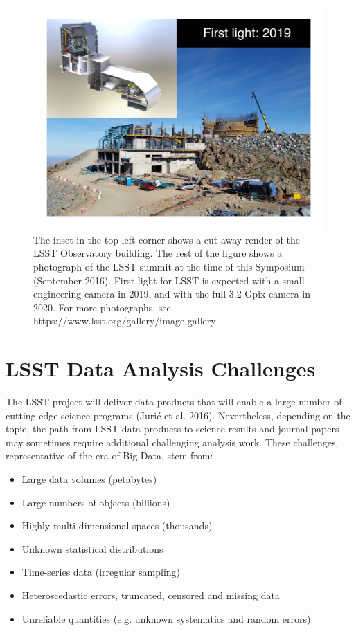 \documentclass{iau}
\begin{document}
\begin{figure}[t!]
\begin{center}
\includegraphics[width=0.99\textwidth, angle=0]{summit2019.pdf} 
\caption{
The inset in the top left corner shows a cut-away render of the LSST Observatory building. 
The rest of the figure shows a photograph of the LSST summit at the time of this 
Symposium (September 2016). First light for LSST is expected with a small engineering
camera in 2019, and with the full 3.2 Gpix camera in 2020. For more 
photographs, see https://www.lsst.org/gallery/image-gallery}
\label{fig:summit2019}
\end{center}
\end{figure}



\section{LSST Data Analysis Challenges}


The LSST project will deliver data products that will enable a large number of cutting-edge science 
programs (Juri\'{c} et al. 2016). Nevertheless, depending on the topic, the path from LSST data 
products to science results and journal papers may sometimes require additional challenging
analysis work. These challenges, representative of the era of Big Data, stem from:
\begin{itemize}
\item Large data volumes (petabytes)
\item Large numbers of objects (billions)
\item Highly multi-dimensional spaces (thousands)
\item Unknown statistical distributions 
\item Time-series data (irregular sampling)
\item Heteroscedastic errors, truncated, censored and missing data
\item Unreliable quantities (e.g. unknown systematics and random errors)\\
\end{itemize}
\end{document}
